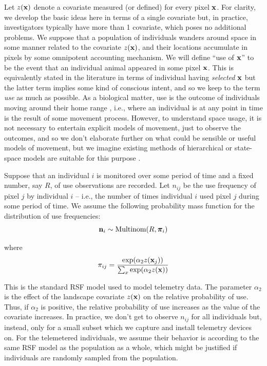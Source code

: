 \documentclass[12pt]{article}
\begin{document}
Let $z({\bf
  x})$ denote a covariate measured (or defined) for every pixel ${\bf
  x}$. For clarity, we develop the basic ideas here in terms of a
single covariate but, in practice, investigators typically have more
than 1 covariate, which poses no additional problems.
We suppose that a population of individuals wanders around space in
some manner related to the covariate $z({\bf x})$, and their locations
accumulate in pixels by some omnipotent accounting mechanism. We will
define ``use of ${\bf x}$'' to be the event that an individual animal
appeared in some pixel ${\bf x}$. This is equivalently stated in the
literature in terms of individual having {\it selected} ${\bf x}$ but
the latter term implies some kind of conscious intent, and so we keep
to the term {\it use} as much as possible.  As a biological matter,
use is the outcome of individuals moving around their home range \citep{hooten_etal:2010},
i.e., where an individual is at any point in time is the result of
some movement process. However, to understand space usage, it is not
necessary to entertain explicit models of movement, just to observe
the outcomes, and so we don't elaborate further on what could be
sensible or useful models of movement, but we imagine existing methods
of hierarchical or state-space
models are suitable for this purpose \citep{jonsen_etal:2005,
  forester_etal:2007, patterson_etal:2008, hooten_etal:2010, mcclintock_etal:2012}.

Suppose that an individual $i$ is monitored over some period of time
and a fixed number, say $R$, of use observations are recorded.
Let $n_{ij}$ be the use frequency of pixel $j$ by individual $i$ --
i.e.,
the number of times individual $i$ used pixel $j$
during some period of time.  We assume the
following probability mass function for the distribution of use
frequencies:
\[
{\bf n}_{i} \sim \mbox{Multinom}(R, {\bm \pi}_{i})
\]

{\flushleft where}
\[
 \pi_{ij} = \frac{ \exp( \alpha_{2} z({\bf x}_{j}) ) }{ \sum_{x}
   \exp(\alpha_{2} z({\bf x}))}
\]

{\flushleft This} is the standard RSF model \citep{manly_etal:2002} used to model
telemetry data.
The parameter $\alpha_2$ is the effect of the
landscape covariate $z({\bf x})$ on the relative probability of
use. Thus, if $\alpha_2$ is positive, the relative probability of use
increases as the value of the covariate increases. 
In practice, we don't get to
observe $n_{ij}$ for all individuals but, instead, only for a small
subset which we capture and install telemetry devices on.
For the telemetered individuals, we assume their behavior is according
to the same RSF model as the population as a whole, which might be
justified if individuals are randomly sampled from the population.
\end{document}
